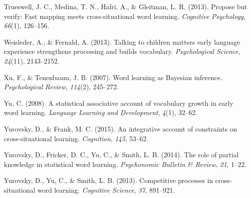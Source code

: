 \documentclass[english,,man,floatsintext]{apa6}
\begin{document}
\leavevmode\hypertarget{ref-trueswell2013}{}%
Trueswell, J. C., Medina, T. N., Hafri, A., \& Gleitman, L. R. (2013). Propose but verify: Fast mapping meets cross-situational word learning. \emph{Cognitive Psychology}, \emph{66}(1), 126--156.

\leavevmode\hypertarget{ref-weisleder2013}{}%
Weisleder, A., \& Fernald, A. (2013). Talking to children matters early language experience strengthens processing and builds vocabulary. \emph{Psychological Science}, \emph{24}(11), 2143--2152.

\leavevmode\hypertarget{ref-xu2007}{}%
Xu, F., \& Tenenbaum, J. B. (2007). Word learning as Bayesian inference. \emph{Psychological Review}, \emph{114}(2), 245--272.

\leavevmode\hypertarget{ref-yu2008}{}%
Yu, C. (2008). A statistical associative account of vocabulary growth in early word learning. \emph{Language Learning and Development}, \emph{4}(1), 32--62.

\leavevmode\hypertarget{ref-yurovsky2015}{}%
Yurovsky, D., \& Frank, M. C. (2015). An integrative account of constraints on cross-situational learning. \emph{Cognition}, \emph{145}, 53--62.

\leavevmode\hypertarget{ref-yurovsky2014}{}%
Yurovsky, D., Fricker, D. C., Yu, C., \& Smith, L. B. (2014). The role of partial knowledge in statistical word learning. \emph{Psychonomic Bulletin \& Review}, \emph{21}, 1--22.

\leavevmode\hypertarget{ref-yurovsky2013}{}%
Yurovsky, D., Yu, C., \& Smith, L. B. (2013). Competitive processes in cross-situational word learning. \emph{Cognitive Science}, \emph{37}, 891--921.
\end{document}
